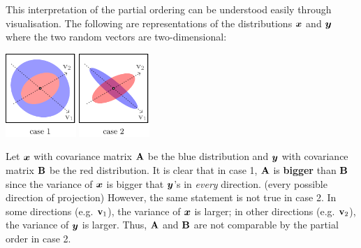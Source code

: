 \documentclass[a4paper]{article}
\begin{document}
\begin{multicols*}{2}
This interpretation of the partial ordering can be understood easily through visualisation.
The following are representations of the distributions $\xx$ and $\yy$ where the
two random vectors are two-dimensional:
\begin{center}
	\includegraphics[width=0.2\textwidth]{figures/visual-1.pdf}
	\hspace{0.5em}
	\includegraphics[width=0.2\textwidth]{figures/visual-2.pdf}
\end{center}
Let $\xx$ with covariance matrix $\AA$ be the blue distribution and $\yy$ with
covariance matrix $\BB$ be the red distribution.
It is clear that in case 1, $\AA$ is \textbf{bigger} than $\BB$ since the variance of $\xx$ is
bigger that $\yy$'s in \emph{every} direction. (every possible direction of projection)
However, the same statement is not true in case 2.
In some directions (e.g.\! $\vv_1$), the variance of $\xx$ is larger;
in other directions (e.g.\! $\vv_2$), the variance of $\yy$ is larger.
Thus, $\AA$ and $\BB$ are not comparable by the partial order in case 2.
\asDemonstrated

\end{multicols*}
\end{document}
